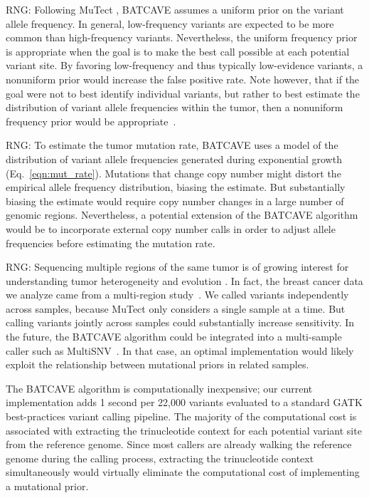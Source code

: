 \documentclass[a4,center,fleqn]{NAR}
\newcommand{\rngcomment}[1]{{\color{red}RNG: #1}}
\newcommand{\batcave}{BATCAVE\xspace}
\begin{document}
\rngcomment{
Following MuTect \cite{Cibulskis2013}, \batcave assumes a uniform prior on the variant allele frequency.
In general, low-frequency variants are expected to be more common than high-frequency variants.
Nevertheless, the uniform frequency prior is appropriate when the goal is to make the best call possible at each potential variant site.
By favoring low-frequency and thus typically low-evidence variants, a nonuniform prior would increase the false positive rate.
Note however, that if the goal were not to best identify individual variants, but rather to best estimate the distribution of variant allele frequencies within the tumor, then a nonuniform frequency prior would be appropriate~\cite{Nielsen2012}.
}

\rngcomment{
To estimate the tumor mutation rate, \batcave uses a model of the distribution of variant allele frequencies  generated during exponential growth (Eq.~\ref{eqn:mut_rate}).
Mutations that change copy number might distort the empirical allele frequency distribution, biasing the estimate.
But substantially biasing the estimate would require copy number changes in a large number of genomic regions.
Nevertheless, a potential extension of the \batcave algorithm would be to incorporate external copy number calls in order to adjust allele frequencies before estimating the mutation rate.
}

\rngcomment{
Sequencing multiple regions of the same tumor is of growing interest for understanding tumor heterogeneity and evolution \cite{McGranahan2017}.
In fact, the breast cancer data we analyze came from a multi-region study~\cite{Shi2018}.
We called variants independently across samples, because MuTect only considers a single sample at a time.
But calling variants jointly across samples could substantially increase sensitivity.
In the future, the \batcave algorithm could be integrated into a multi-sample caller such as MultiSNV~\cite{Josephidou2015}.
In that case, an optimal implementation would likely exploit the relationship between mutational priors in related samples.
}

The \batcave algorithm is computationally inexpensive; our current implementation adds 1 second per 22,000 variants evaluated to a standard GATK best-practices variant calling pipeline.
The majority of the computational cost is associated with extracting the trinucleotide context for each potential variant site from the reference genome.
Since most callers are already walking the reference genome during the calling process, extracting the trinucleotide context simultaneously would virtually eliminate the computational cost of implementing a mutational prior.
\end{document}
